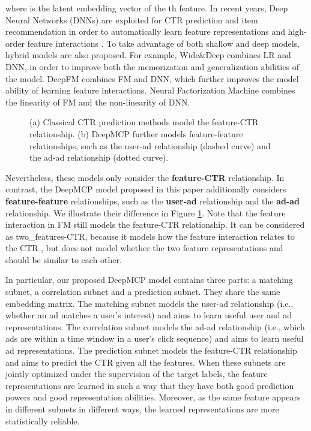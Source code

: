 \documentclass{article}
\begin{document}
where  is the latent embedding vector of the th feature.
In recent years, Deep Neural Networks (DNNs) \cite{lecun2015deep} are exploited for CTR prediction and item recommendation in order to automatically learn feature representations and high-order feature interactions \cite{van2013deep,zhang2016deep,qu2016product,covington2016deep}. To take advantage of both shallow and deep models, hybrid models are also proposed. For example, Wide\&Deep \cite{cheng2016wide} combines LR and DNN, in order to improve both the memorization and generalization abilities of the model.
DeepFM \cite{guo2017deepfm} combines FM and DNN, which further improves the model ability of learning feature interactions.
Neural Factorization Machine \cite{he2017neural} combines the linearity of FM and the non-linearity of DNN.

\begin{figure}[!t]
\centering
{} \hskip 3pt
\vskip -8pt
\caption{(a) Classical CTR prediction methods model the feature-CTR relationship. (b) DeepMCP further models feature-feature relationships, such as the user-ad relationship (dashed curve) and the ad-ad relationship (dotted curve).}
\vskip -10pt
\label{illus}
\end{figure}

Nevertheless, these models only consider the \textbf{feature-CTR} relationship. In contrast, the DeepMCP model proposed in this paper additionally considers \textbf{feature-feature} relationships, such as the \textbf{user-ad} relationship and the \textbf{ad-ad} relationship. We illustrate their difference in Figure \ref{illus}. Note that the feature interaction in FM still models the feature-CTR relationship. It can be considered as two\_features-CTR, because it models how the feature interaction  relates to the CTR , but does not model whether the two feature representations  and  should be similar to each other.

In particular, our proposed DeepMCP model contains three parts: a matching subnet, a correlation subnet and a prediction subnet. They share the same embedding matrix.
The matching subnet models the user-ad relationship (i.e., whether an ad matches a user's interest) and aims to learn useful user and ad representations.
The correlation subnet models the ad-ad relationship (i.e., which ads are within a time window in a user's click sequence) and aims to learn useful ad representations.
The prediction subnet models the feature-CTR relationship and aims to predict the CTR given all the features.
When these subnets are jointly optimized under the supervision of the target labels, the feature representations are learned in such a way that they have both good prediction powers and good representation abilities. Moreover, as the same feature appears in different subnets in different ways, the learned representations are more statistically reliable.
\end{document}
